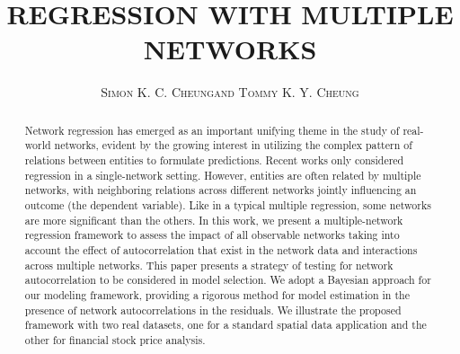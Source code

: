\documentclass[times, doublespace]{auth}
\begin{document}
\title{REGRESSION WITH MULTIPLE NETWORKS}

\author{\rmfamily\scshape{Simon} K. C. \scshape{Cheung}\footnotemark[1] \scshape{and Tommy} K. Y. \scshape{Cheung}\footnotemark[2]}




\begin{abstract}


Network regression has emerged as an important unifying theme in the study of real-world networks, evident by the growing interest in utilizing the complex pattern of relations between entities to formulate predictions. Recent works only considered regression in a single-network setting. However, entities are often related by multiple networks, with neighboring relations across different networks jointly influencing an outcome (the dependent variable). Like in a typical multiple regression, some networks are more significant than the others. In this work, we present a multiple-network regression framework to assess the impact of all observable networks taking into account the effect of autocorrelation that exist in the network data and interactions across multiple networks. This paper presents a strategy of testing for network autocorrelation to be considered in model selection. We adopt a Bayesian approach for our modeling framework, providing a rigorous method for model estimation in the presence of network autocorrelations in the residuals. We illustrate the proposed framework with two real datasets, one for a standard spatial data application and the other for financial stock price analysis.  
\newline

\end{abstract}
\end{document}
